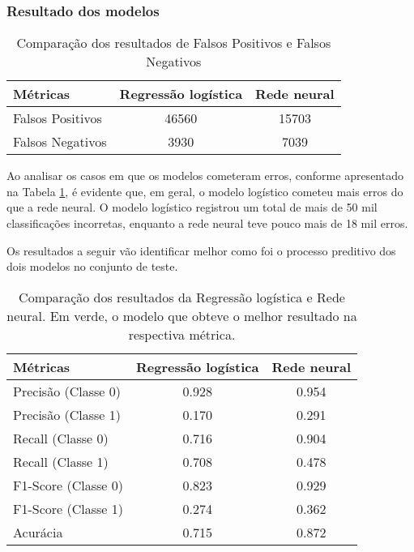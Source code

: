 \subsubsection{Resultado dos modelos}

\begin{table}[H]
  \centering
  \begin{tabular}{lcc}
    \hline
    \textbf{Métricas} & \textbf{Regressão logística} & \textbf{Rede neural} \\
    \hline
    Falsos Positivos   & 46560                     & 15703 \\
    Falsos Negativos   & 3930                   & 7039 \\
    \hline
  \end{tabular}
  \caption{Comparação dos resultados de Falsos Positivos e Falsos Negativos}
  \label{tab:false_positives_negatives}
\end{table}

Ao analisar os casos em que os modelos cometeram erros, conforme apresentado na Tabela \ref{tab:false_positives_negatives}, 
é evidente que, em geral, o modelo logístico cometeu mais erros do que a rede neural. O modelo logístico registrou um total 
de mais de 50 mil classificações incorretas, enquanto a rede neural teve pouco mais de 18 mil erros.

Os resultados a seguir vão identificar melhor como foi o processo preditivo dos dois modelos no conjunto de teste.

\begin{table}[H]
  \centering
  \begin{tabular}{lcc}
    \hline
    \textbf{Métricas} & \textbf{Regressão logística} & \textbf{Rede neural} \\
    \hline
    Precisão (Classe 0) & 0.928                     & \cellcolor{green!25}0.954 \\
    Precisão (Classe 1) & 0.170                     &\cellcolor{green!25}0.291 \\
    Recall   (Classe 0) & 0.716                     & \cellcolor{green!25}0.904 \\
    Recall   (Classe 1) & \cellcolor{green!25}0.708 & 0.478 \\
    F1-Score (Classe 0) &  0.823                    & \cellcolor{green!25}0.929 \\
    F1-Score (Classe 1) & 0.274                     & \cellcolor{green!25}0.362 \\
    Acurácia            & 0.715                     & \cellcolor{green!25}0.872 \\
    \hline
  \end{tabular}
  \caption{Comparação dos resultados da Regressão logística e Rede neural. Em verde, o modelo que obteve o melhor resultado na respectiva métrica.}
  \label{tab:comparison_results}
\end{table}




